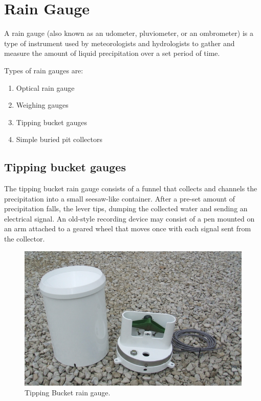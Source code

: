 \documentclass[a4paper,12pt]{report}
\begin{document}


\section{Rain Gauge}
A rain gauge (also known as an udometer, pluviometer, or an ombrometer) is a type of instrument used by meteorologists and hydrologists 
to gather and measure the amount of liquid precipitation over a set period of time.\cite{wiki}
\newline

Types of rain gauges are: 
\begin{enumerate}
 \item Optical rain gauge
 \item Weighing gauges
 \item Tipping bucket gauges
 \item Simple buried pit collectors
\end{enumerate}

\subsection{Tipping bucket gauges}
The tipping bucket rain gauge consists of a funnel that collects and channels the precipitation into a small seesaw-like container. 
After a pre-set amount of precipitation falls, the lever tips, dumping the collected water and sending an electrical signal. 
An old-style recording device may consist of a pen mounted on an arm attached to a geared wheel that moves once with each signal sent from the collector.\cite{wiki}

\begin{figure}[h]
 \centering
  \includegraphics[width=.70\textwidth]{figures/TippingBucket.jpg}
  \caption{Tipping Bucket rain gauge.}
  \label{TippingBucket}
 \end{figure}
\end{document}
